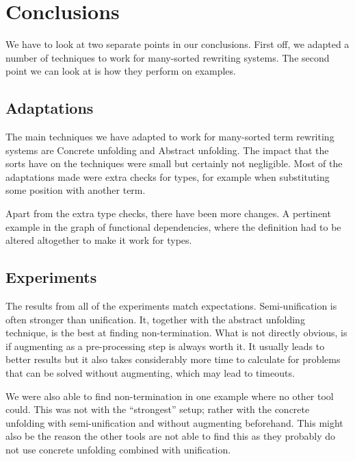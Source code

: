 \chapter{Conclusions}\label{conclusions}
We have to look at two separate points in our conclusions. First off, we adapted a number of techniques to work for many-sorted rewriting systems. The second point we can look at is how they perform on examples. 
\section{Adaptations}
The main techniques we have adapted to work for many-sorted term rewriting systems are Concrete unfolding and Abstract unfolding. The impact that the sorts have on the techniques were small but certainly not negligible. Most of the adaptations made were extra checks for types, for example when substituting some position with another term. 

Apart from the extra type checks, there have been more changes. A pertinent example in the graph of functional dependencies, where the definition had to be altered altogether to make it work for types.

\section{Experiments}
The results from all of the experiments match expectations. Semi-unification is often stronger than unification. It, together with the abstract unfolding technique, is the best at finding non-termination. What is not directly obvious, is if augmenting as a pre-processing step is always worth it. It usually leads to better results but it also takes considerably more time to calculate for problems that can be solved without augmenting, which may lead to timeouts. 

We were also able to find non-termination in one example where no other tool could. This was not with the ``strongest'' setup; rather with the concrete unfolding with semi-unification and without augmenting beforehand. This might also be the reason the other tools are not able to find this as they probably do not use concrete unfolding combined with unification.
